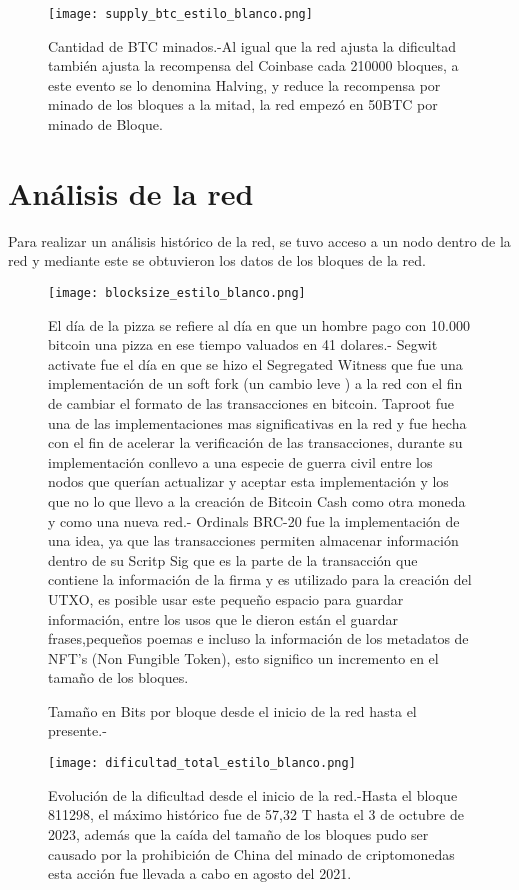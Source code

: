 \documentclass{rbf}
\begin{document}
\begin{figure} [h]
  \texttt{[image: supply\_btc\_estilo\_blanco.png]}
    
 \caption{Cantidad de BTC minados.-Al igual que la red ajusta la dificultad también ajusta la recompensa del Coinbase cada 210000 bloques, a este evento se lo denomina Halving, y reduce la recompensa por minado de los bloques a la mitad, la red empezó en 50BTC por minado de Bloque. }


\end{figure}


\section{Análisis de la red}
Para realizar un análisis histórico de la red, se tuvo acceso a un nodo dentro de la red y mediante  este se obtuvieron los datos de los bloques de la red.

\begin{figure} [h]
  \texttt{[image: blocksize\_estilo\_blanco.png]}
    
 \caption{Tamaño en Bits por bloque desde el inicio de la red hasta el presente.- }
El día de la pizza se refiere al día en que un hombre pago con 10.000 bitcoin una pizza en ese tiempo valuados en 41 dolares.-
Segwit activate fue el día en que se hizo el Segregated Witness que fue una implementación de un soft fork (un cambio leve ) a la red con el fin de cambiar el formato de las transacciones en bitcoin.
Taproot fue una de las implementaciones mas significativas en la red y fue hecha con el fin de acelerar la verificación de las transacciones, durante su implementación conllevo a una especie de guerra civil entre los nodos que querían actualizar y aceptar esta implementación y los que no lo que llevo a la creación de Bitcoin Cash como otra moneda y como una nueva red.-
Ordinals BRC-20 fue la implementación de una idea, ya que las transacciones permiten almacenar información dentro de su Scritp Sig que es la parte de la transacción que contiene la información de la firma y es utilizado para la creación del UTXO, es posible usar este pequeño espacio para guardar información, entre los usos que le dieron están el guardar frases,pequeños poemas e incluso la información de los metadatos de NFT's (Non Fungible Token), esto significo un incremento en el tamaño de los bloques.

\end{figure}

\begin{figure} [h]
  \texttt{[image: dificultad\_total\_estilo\_blanco.png]}
    
 \caption{Evolución de la dificultad desde el inicio de la red.-Hasta el bloque 811298, el máximo histórico fue de 57,32 T hasta el 3 de octubre de 2023, además que la caída del tamaño de los bloques pudo ser causado por la prohibición de China del minado de criptomonedas esta acción fue llevada a cabo en agosto del 2021. }

\end{figure}
\end{document}
